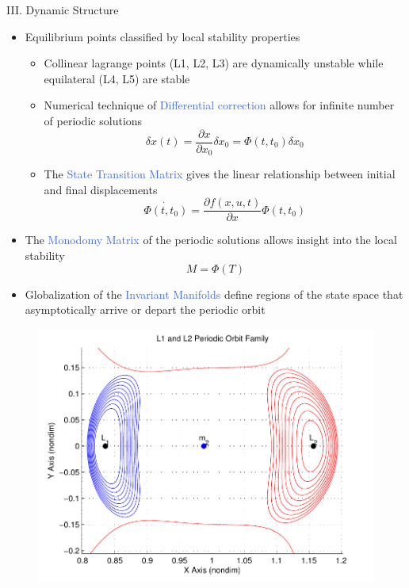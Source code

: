 \documentclass[final, usenames, dvipsnames]{beamer}
\newlength{\twocolwidth}
\def\Emph{\textcolor{RoyalBlue}}
\begin{document}
\begin{frame}[t]
\begin{columns}[T,onlytextwidth]
\begin{column}{\twocolwidth}
\begin{block}{III. Dynamic Structure} %
	\begin{minipage}{0.5\columnwidth} %
	\begin{itemize}
		\item Equilibrium points classified by local stability properties 
			\begin{itemize}
				\item Collinear lagrange points (L1, L2, L3) are dynamically unstable while equilateral (L4, L5) are stable
				\item Numerical technique of \Emph{Differential correction} allows for infinite number of periodic solutions
					\begin{equation*}
						\delta x(t) = \frac{\partial x}{\partial x_0} \delta x_0 = \Phi(t,t_0) \delta x_0
					\end{equation*}
				\item The \Emph{State Transition Matrix} gives the linear relationship between initial and final displacements
					\begin{equation*}
						\dot{\Phi(t,t_0)} = \frac{\partial f(x, u , t)}{\partial x} \Phi(t,t_0)
					\end{equation*}
			\end{itemize}
		\item The \Emph{Monodomy Matrix} of the periodic solutions allows insight into the local stability 
			\begin{equation*}
				M = \Phi(T)
			\end{equation*}
		\item Globalization of the \Emph{Invariant Manifolds} define regions of the state space that asymptotically arrive or depart the periodic orbit
	\end{itemize}
	\end{minipage}%
	\begin{minipage}{0.5\columnwidth}%
		\begin{figure}
			\includegraphics[width = 0.9\columnwidth]{L1L2_periodic_family}

\end{figure}
\end{minipage}
\end{block}
\end{column}
\end{columns}
\end{frame}
\end{document}
